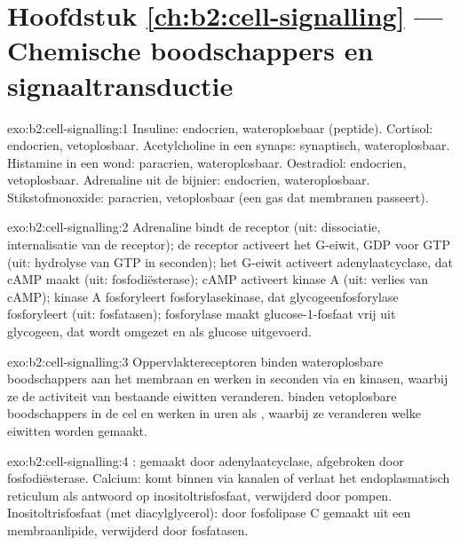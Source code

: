 \section*{Hoofdstuk \ref{ch:b2:cell-signalling} --- Chemische boodschappers en signaaltransductie}

\begin{solution}{exo:b2:cell-signalling:1}
Insuline: endocrien, wateroplosbaar (peptide). Cortisol: endocrien,
vetoplosbaar. Acetylcholine in een synaps: synaptisch, wateroplosbaar.
Histamine in een wond: paracrien, wateroplosbaar. Oestradiol: endocrien,
vetoplosbaar. Adrenaline uit de bijnier: endocrien, wateroplosbaar.
Stikstofmonoxide: paracrien, vetoplosbaar (een gas dat membranen
passeert).
\end{solution}

\begin{solution}{exo:b2:cell-signalling:2}
Adrenaline bindt de receptor (uit: dissociatie, internalisatie van de
receptor); de receptor activeert het G-eiwit, GDP voor GTP (uit: hydrolyse van
GTP in seconden); het G-eiwit activeert adenylaatcyclase, dat cAMP maakt
(uit: fosfodiësterase); cAMP activeert kinase A (uit: verlies van cAMP);
kinase A fosforyleert fosforylasekinase, dat glycogeenfosforylase
fosforyleert (uit: fosfatasen); fosforylase maakt glucose-1-fosfaat vrij uit
glycogeen, dat wordt omgezet en als glucose uitgevoerd.
\end{solution}

\begin{solution}{exo:b2:cell-signalling:3}
Oppervlaktereceptoren binden wateroplosbare boodschappers aan het membraan en
werken in seconden via  en kinasen, waarbij ze de
activiteit van bestaande eiwitten veranderen.  binden
vetoplosbare boodschappers in de cel en werken in uren als
, waarbij ze veranderen welke eiwitten worden gemaakt.
\end{solution}

\begin{solution}{exo:b2:cell-signalling:4}
: gemaakt door adenylaatcyclase, afgebroken door
fosfodiësterase. Calcium: komt binnen via kanalen of verlaat het
endoplasmatisch reticulum als antwoord op inositoltrisfosfaat, verwijderd door
pompen. Inositoltrisfosfaat (met diacylglycerol): door fosfolipase C gemaakt
uit een membraanlipide, verwijderd door fosfatasen.
\end{solution}

